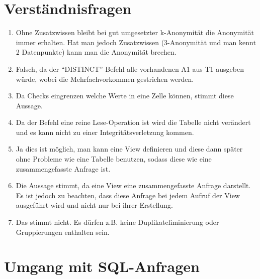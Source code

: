\documentclass{scrartcl}
\begin{document}
\maketitle

\section{Verständnisfragen}
\begin{enumerate}
    \item Ohne Zusatzwissen bleibt bei gut umgesetzter k-Anonymität die Anonymität immer erhalten. Hat man jedoch Zusatzwissen (3-Anonymität und man kennt 2 Datenpunkte) kann man die Anonymität brechen.
    \item Falsch, da der ``DISTINCT''-Befehl alle vorhandenen A1 aus T1 ausgeben würde, wobei die Mehrfachvorkommen gestrichen werden.
    \item Da Checks eingrenzen welche Werte in eine Zelle können, stimmt diese Aussage.
    \item Da der Befehl eine reine Lese-Operation ist wird die Tabelle nicht verändert und es kann nicht zu einer Integritätsverletzung kommen.
    \item Ja dies ist möglich, man kann eine View definieren und diese dann später ohne Probleme wie eine Tabelle benutzen, sodass diese wie eine zusammengefasste Anfrage ist. 
    \item Die Aussage stimmt, da eine View eine zusammengefasste Anfrage darstellt. Es ist jedoch zu beachten, dass diese Anfrage bei jedem Aufruf der View ausgeführt wird und nicht nur bei ihrer Erstellung.
    \item Das stimmt nicht. Es dürfen z.B. keine Duplikateliminierung oder Gruppierungen enthalten sein.
\end{enumerate}
\section{Umgang mit SQL-Anfragen}
\end{document}

